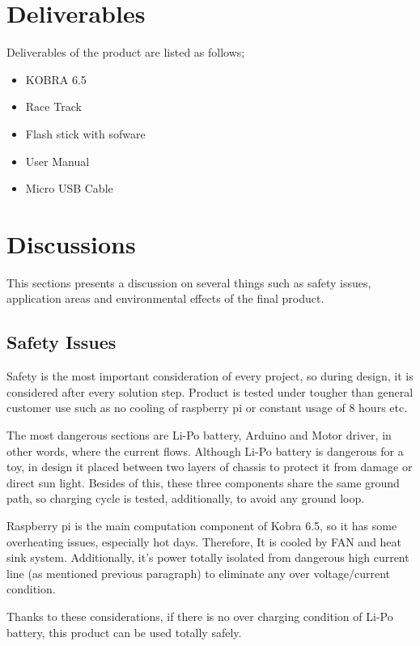 \documentclass[a4paper,12pt]{article}
\begin{document}
	\newpage

	\section{Deliverables}
		Deliverables of the product are listed as follows;
		\begin{itemize}
			\item KOBRA 6.5  
			\item Race Track 
			\item Flash stick with sofware 
			\item User Manual 
			\item Micro USB Cable
		\end{itemize} 
	\section{Discussions}
		This sections presents a discussion on several things such as safety issues, application areas and environmental effects of the final product.
	
	\subsection{Safety Issues}
		Safety is the most important consideration of every project, so during design, it is considered after every solution step. Product is tested under tougher than general customer use such as no cooling of raspberry pi or constant usage of 8 hours etc. 
		
		The most dangerous sections are Li-Po battery, Arduino and Motor driver, in other words, where the current flows. Although Li-Po battery is dangerous for a toy, in design it placed between two layers of chassis to protect it from damage or direct sun light. Besides of this, these three components share the same ground path, so charging cycle is tested, additionally, to avoid any ground loop. 
		
		Raspberry pi is the main computation component of Kobra 6.5, so it has some overheating issues, especially hot days. Therefore, It is cooled by FAN and heat sink system. Additionally, it’s power totally isolated from dangerous high current line (as mentioned previous paragraph) to eliminate any over voltage/current condition. 
		
		Thanks to these considerations, if there is no over charging condition of Li-Po battery, this product can be used totally safely.  
		
\end{document}
